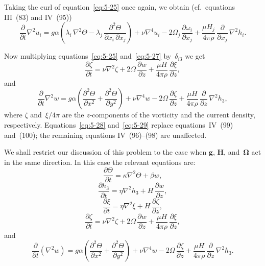 Taking the curl of equation~\eqref{eq:5-25} once again, we obtain
(cf.\ equations III~(83) and IV~(95))
\begin{equation}
  \frac{\partial}{\partial t}\nabla^{2}u_i
  = g\alpha\!\left(
      \lambda_i\,\nabla^{2}\Theta
      - \lambda_j\,\frac{\partial^{2}\Theta}{\partial x_i\,\partial x_j}
    \right)
  + \nu\nabla^{4}u_i
  - 2\Omega_j\,\frac{\partial\omega_i}{\partial x_j}
  + \frac{\mu H_j}{4\pi\rho}\,\frac{\partial}{\partial x_j}\,\nabla^{2}h_i.
  \label{eq:5-27}
\end{equation}

Now multiplying equations~\eqref{eq:5-25} and~\eqref{eq:5-27} by~$\delta_{i3}$
we get
\begin{equation}
  \frac{\partial\zeta}{\partial t}
  = \nu\nabla^{2}\zeta
  + 2\Omega\,\frac{\partial w}{\partial z}
  + \frac{\mu H}{4\pi\rho}\,\frac{\partial\xi}{\partial z},
  \label{eq:5-28}
\end{equation}
and
\begin{equation}
  \frac{\partial}{\partial t}\nabla^{2}w
  = g\alpha\!\left(
      \frac{\partial^{2}\Theta}{\partial x^{2}}
      + \frac{\partial^{2}\Theta}{\partial y^{2}}
    \right)
  + \nu\nabla^{4}w
  - 2\Omega\,\frac{\partial\zeta}{\partial z}
  + \frac{\mu H}{4\pi\rho}\,\frac{\partial}{\partial z}\,\nabla^{2}h_3,
  \label{eq:5-29}
\end{equation}
where $\zeta$ and~$\xi/4\pi$ are the $z$-components of the vorticity and the
current density, respectively.  Equations~\eqref{eq:5-28} and~\eqref{eq:5-29}
replace equations~IV~(99) and~(100); the remaining equations IV~(96)--(98) are
unaffected.

We shall restrict our discussion of this problem to the case when
$\mathbf{g}$, $\mathbf{H}$, and~$\boldsymbol{\Omega}$ act in the same
direction.  In this case the relevant equations are:
\begin{equation}
  \frac{\partial\Theta}{\partial t}
  = \kappa\nabla^{2}\Theta + \beta w,
  \label{eq:5-30}
\end{equation}
\begin{equation}
  \frac{\partial h_3}{\partial t}
  = \eta\nabla^{2}h_3 + H\,\frac{\partial w}{\partial z},
  \label{eq:5-31}
\end{equation}
\begin{equation}
  \frac{\partial\xi}{\partial t}
  = \eta\nabla^{2}\xi + H\,\frac{\partial\zeta}{\partial z},
  \label{eq:5-32}
\end{equation}
\begin{equation}
  \frac{\partial\zeta}{\partial t}
  = \nu\nabla^{2}\zeta
  + 2\Omega\,\frac{\partial w}{\partial z}
  + \frac{\mu H}{4\pi\rho}\,\frac{\partial\xi}{\partial z},
  \label{eq:5-33}
\end{equation}
and
\begin{equation}
  \frac{\partial}{\partial t}(\nabla^{2}w)
  = g\alpha\!\left(
      \frac{\partial^{2}\Theta}{\partial x^{2}}
      + \frac{\partial^{2}\Theta}{\partial y^{2}}
    \right)
  + \nu\nabla^{4}w
  - 2\Omega\,\frac{\partial\zeta}{\partial z}
  + \frac{\mu H}{4\pi\rho}\,\frac{\partial}{\partial z}\,\nabla^{2}h_3.
  \label{eq:5-34}
\end{equation}

